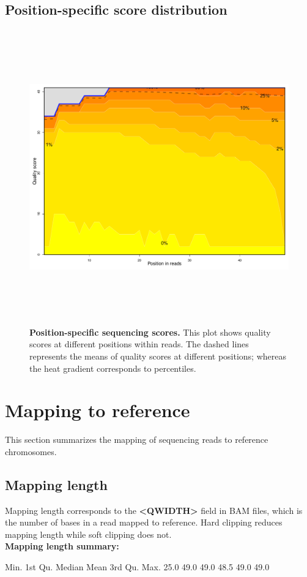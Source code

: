 \documentclass{article}
\begin{document}
\subsection{Position-specific score distribution}

\begin{center}
\begin{figure}[H]
\includegraphics[width=7in, height=5in, page=1]{bamchop-qual-position}
\caption{\textbf{Position-specific sequencing scores.} This plot shows quality scores at different positions within reads. The dashed lines represents the means of quality scores at different positions; whereas the heat gradient corresponds to percentiles.}
\end{figure}
\end{center}


\pagebreak
\section{Mapping to reference}
This section summarizes the mapping of sequencing reads to reference chromosomes.
\subsection{Mapping length}
Mapping length corresponds to the \textbf{<QWIDTH>} field in BAM files, which is the number of bases in a read mapped to reference. Hard clipping reduces mapping length while soft clipping does not.
\vspace*{1\baselineskip}
\\{\textbf{Mapping length summary:}}
\begin{Schunk}
\begin{Soutput}
   Min. 1st Qu.  Median    Mean 3rd Qu.    Max. 
   25.0    49.0    49.0    48.5    49.0    49.0 
\end{Soutput}
\end{Schunk}
\end{document}

